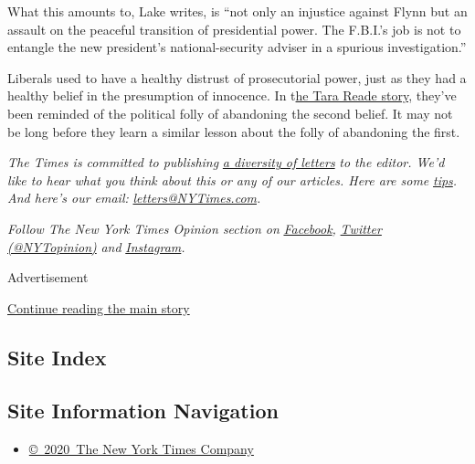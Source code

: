 What this amounts to, Lake writes, is ``not only an injustice against
Flynn but an assault on the peaceful transition of presidential power.
The F.B.I.'s job is not to entangle the new president's
national-security adviser in a spurious investigation.''

Liberals used to have a healthy distrust of prosecutorial power, just as
they had a healthy belief in the presumption of innocence. In
t\href{https://www.nytimes3xbfgragh.onion/2020/05/01/opinion/joe-biden-tara-reade.html}{he
Tara Reade story,} they've been reminded of the political folly of
abandoning the second belief. It may not be long before they learn a
similar lesson about the folly of abandoning the first.

\emph{The Times is committed to publishing}
\href{https://www.nytimes3xbfgragh.onion/2019/01/31/opinion/letters/letters-to-editor-new-york-times-women.html}{\emph{a
diversity of letters}} \emph{to the editor. We'd like to hear what you
think about this or any of our articles. Here are some}
\href{https://help.nytimes3xbfgragh.onion/hc/en-us/articles/115014925288-How-to-submit-a-letter-to-the-editor}{\emph{tips}}\emph{.
And here's our email:}
\href{mailto:letters@NYTimes.com}{\emph{letters@NYTimes.com}}\emph{.}

\emph{Follow The New York Times Opinion section on}
\href{https://www.facebookcorewwwi.onion/nytopinion}{\emph{Facebook}}\emph{,}
\href{http://twitter.com/NYTOpinion}{\emph{Twitter (@NYTopinion)}}
\emph{and}
\href{https://www.instagram.com/nytopinion/}{\emph{Instagram}}\emph{.}

Advertisement

\protect\hyperlink{after-bottom}{Continue reading the main story}

\hypertarget{site-index}{%
\subsection{Site Index}\label{site-index}}

\hypertarget{site-information-navigation}{%
\subsection{Site Information
Navigation}\label{site-information-navigation}}

\begin{itemize}
\tightlist
\item
  \href{https://help.nytimes3xbfgragh.onion/hc/en-us/articles/115014792127-Copyright-notice}{©~2020~The
  New York Times Company}
\end{itemize}

